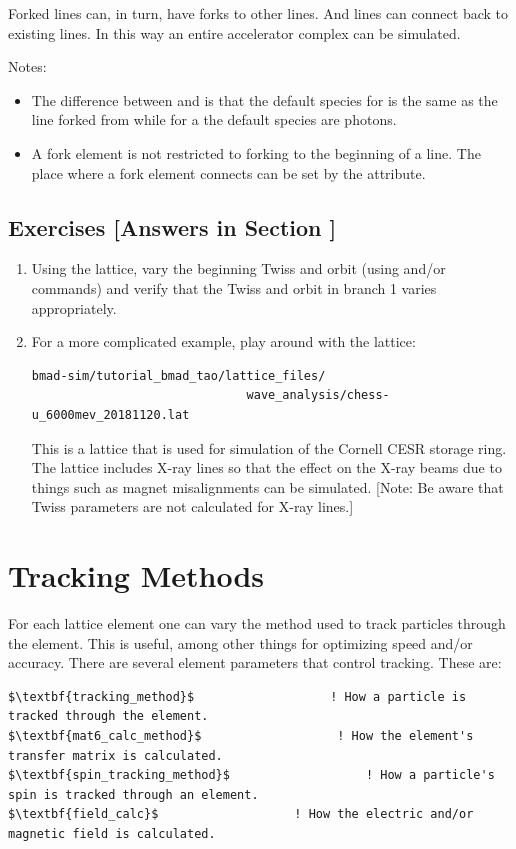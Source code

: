 \documentclass{hitec}     %
\newcommand{\Section}[1]{\section{#1}\vspace*{-1ex}}
\begin{document}
Forked lines can, in turn, have forks to other lines. And lines can connect back to existing lines. In this
way an entire accelerator complex can be simulated. 

Notes:
\vspace{-5 pt}
\begin{itemize}
\item
The difference between  and  is that the default species for  is
the same as the line forked from while for a  the default species are photons.
\item
A fork element is not restricted to forking to the beginning of a line.  The place where a fork
element connects can be set by the  attribute.
\end{itemize}


\subsection{Exercises [Answers in Section ]}
\label{s:fork.ex}

\begin{enumerate}[label=\thesection.\arabic{enumi}]
\item
Using the  lattice, vary the beginning Twiss and orbit (using  and/or
 commands) and verify that the Twiss and orbit in branch 1 varies appropriately.
%
\item
For a more complicated example, play around with the lattice:
\begin{lstlisting}[mathescape]
bmad-sim/tutorial_bmad_tao/lattice_files/
                              wave_analysis/chess-u_6000mev_20181120.lat
\end{lstlisting}
This is a lattice that is used for simulation of the Cornell CESR storage ring. The lattice includes
X-ray lines so that the effect on the X-ray beams due to things such as magnet misalignments can
be simulated. [Note: Be aware that Twiss parameters are not calculated for X-ray lines.]
\end{enumerate}

\newpage

\Section{Tracking Methods}
\label{s:methods}

For each lattice element one can vary the method used to track particles through the element. This is
useful, among other things for optimizing speed and/or accuracy. There are several element parameters
that control tracking. These are:
\begin{lstlisting}[mathescape]
$\textbf{tracking_method}$                   ! How a particle is tracked through the element.
$\textbf{mat6_calc_method}$                   ! How the element's transfer matrix is calculated.
$\textbf{spin_tracking_method}$                   ! How a particle's spin is tracked through an element.
$\textbf{field_calc}$                   ! How the electric and/or magnetic field is calculated.
\end{lstlisting}
\end{document}
